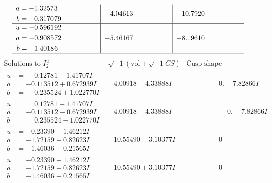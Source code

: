 \documentclass[1p]{elsarticle_modified}
\theoremstyle{definition}
\newcommand{\I}{\sqrt{-1}}
\begin{document}
$$\begin{array}{c|c|c}
\begin{aligned}
a &= -1.32573\phantom{ +0.000000I} \\
b &= \phantom{-}0.317079\phantom{ +0.000000I}\end{aligned}
 & \phantom{-}4.04613\phantom{ +0.000000I} & \phantom{-}10.7920\phantom{ +0.000000I} \\ \hline\begin{aligned}
u &= -0.596192\phantom{ +0.000000I} \\
a &= -0.908572\phantom{ +0.000000I} \\
b &= \phantom{-}1.40186\phantom{ +0.000000I}\end{aligned}
 & -5.46167\phantom{ +0.000000I} & -8.19610\phantom{ +0.000000I}\\
 \hline 
 \end{array}$$\newpage$$\begin{array}{c|c|c}  
\text{Solutions to }I^u_{2}& \I (\text{vol} + \sqrt{-1}CS) & \text{Cusp shape}\\
 \hline 
\begin{aligned}
u &= \phantom{-}0.12781 + 1.41707 I \\
a &= -0.113512 + 0.672939 I \\
b &= \phantom{-}0.235524 + 1.022770 I\end{aligned}
 & -4.00918 + 4.33888 I & \phantom{-0.000000 } 0. - 7.82866 I \\ \hline\begin{aligned}
u &= \phantom{-}0.12781 - 1.41707 I \\
a &= -0.113512 - 0.672939 I \\
b &= \phantom{-}0.235524 - 1.022770 I\end{aligned}
 & -4.00918 - 4.33888 I & \phantom{-0.000000 -}0. + 7.82866 I \\ \hline\begin{aligned}
u &= -0.23390 + 1.46212 I \\
a &= -1.72159 + 0.82623 I \\
b &= -1.46036 - 0.21565 I\end{aligned}
 & -10.55490 - 3.10377 I & \phantom{-0.000000 } 0 \\ \hline\begin{aligned}
u &= -0.23390 - 1.46212 I \\
a &= -1.72159 - 0.82623 I \\
b &= -1.46036 + 0.21565 I\end{aligned}
 & -10.55490 + 3.10377 I & \phantom{-0.000000 } 0 \\ \hline\begin{aligned}

\end{aligned}
\end{array}$$
\end{document}
